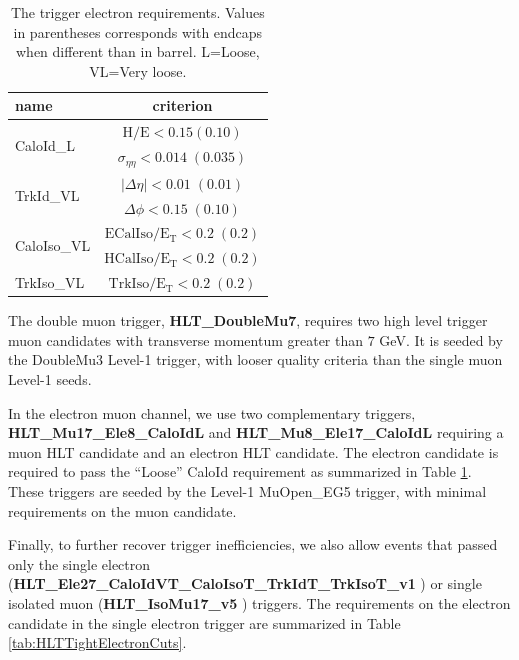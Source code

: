 \begin{table}[htb]
 \caption{The trigger electron requirements. Values in parentheses corresponds with endcaps when different than in barrel. L=Loose, VL=Very loose.}
 \label{tab:HLTElectronCuts}
 \centering
 \begin{tabular}{|l||c|}
   \hline
   name                       &  criterion \\
   \hline \hline
   \multirow{2}{*}{CaloId\_L} & $\mathrm{H/E < 0.15 (0.10) }$ \\
                               & $\sigma_{\eta\eta}\mathrm{< 0.014\;(0.035)}$ \\
    \hline
    \multirow{2}{*}{TrkId\_VL} & $|\Delta\eta|\mathrm{< 0.01\; (0.01)}$ \\
                               & $\Delta\phi\mathrm{< 0.15\;(0.10)}$  \\
    \hline
    \multirow{2}{*}{CaloIso\_VL} & $\mathrm{ECalIso/E_T <0.2\;(0.2)}$ \\
                                 & $\mathrm{HCalIso/E_T <0.2\;(0.2)}$ \\    
    \hline
    TrkIso\_VL                   & $\mathrm{TrkIso/E_T <0.2\;(0.2)}$ \\

   \hline
 \end{tabular}
\end{table}

 
The double muon trigger, {\bf HLT\_DoubleMu7},  requires two high level trigger 
muon candidates with transverse momentum greater than $7$ GeV. It is seeded 
by the DoubleMu3 Level-1 trigger, with looser quality criteria than the
single muon Level-1 seeds. 
 
In the electron muon channel, we use two complementary triggers, 
{\bf HLT\_Mu17\_Ele8\_CaloIdL} and {\bf HLT\_Mu8\_Ele17\_CaloIdL} requiring
a muon HLT candidate and an electron HLT candidate. The electron
candidate is required to pass the ``Loose'' CaloId requirement as 
summarized in Table \ref{tab:HLTElectronCuts}. These triggers are seeded by 
the Level-1 MuOpen\_EG5 trigger, with minimal requirements on the muon candidate.

Finally, to further recover trigger inefficiencies, we also allow events that 
passed only the single electron 
({\bf HLT\_Ele27\_CaloIdVT\_CaloIsoT\_TrkIdT\_TrkIsoT\_v1} ) or single 
isolated muon ({\bf HLT\_IsoMu17\_v5 } ) triggers. The requirements on the 
electron candidate in the single electron trigger are summarized in 
Table \ref{tab:HLTTightElectronCuts}. 

